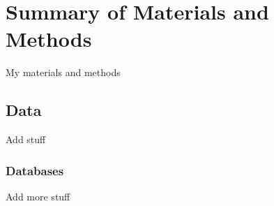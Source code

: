 \chapter{Summary of Materials and Methods}
\label{chap:materialsandmethods}

My materials and methods

\section{Data}
Add stuff


\subsection{Databases}
Add more stuff




